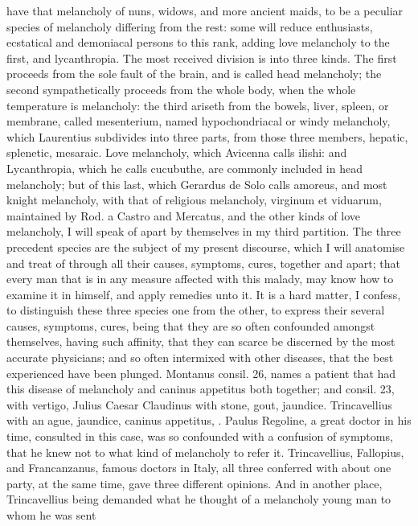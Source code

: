{{have that melancholy of nuns, widows, and more ancient maids, to be a
peculiar species of melancholy differing from the rest: some will
reduce enthusiasts, ecstatical and demoniacal persons to this rank,
adding  love melancholy to the first, and lycanthropia. The most
received division is into three kinds. The first proceeds from the sole
fault of the brain, and is called head melancholy; the second
sympathetically proceeds from the whole body, when the whole
temperature is melancholy: the third ariseth from the bowels, liver,
spleen, or membrane, called mesenterium, named hypochondriacal or windy
melancholy, which Laurentius subdivides into three parts, from
those three members, hepatic, splenetic, mesaraic. Love melancholy,
which Avicenna calls ilishi: and Lycanthropia, which he calls
cucubuthe, are commonly included in head melancholy; but of this last,
which Gerardus de Solo calls amoreus, and most knight melancholy, with
that of religious melancholy, virginum et viduarum, maintained by Rod.
a Castro and Mercatus, and the other kinds of love melancholy, I will
speak of apart by themselves in my third partition. The three precedent
species are the subject of my present discourse, which I will anatomise
and treat of through all their causes, symptoms, cures, together and
apart; that every man that is in any measure affected with this malady,
may know how to examine it in himself, and apply remedies unto it.
It is a hard matter, I confess, to distinguish these three species one
from the other, to express their several causes, symptoms, cures, being
that they are so often confounded amongst themselves, having such
affinity, that they can scarce be discerned by the most accurate
physicians; and so often intermixed with other diseases, that the best
experienced have been plunged. Montanus consil. 26, names a patient
that had this disease of melancholy and caninus appetitus both
together; and consil. 23, with vertigo, Julius Caesar Claudinus
with stone, gout, jaundice. Trincavellius with an ague, jaundice,
caninus appetitus, \etc{}. Paulus Regoline, a great doctor in his
time, consulted in this case, was so confounded with a confusion of
symptoms, that he knew not to what kind of melancholy to refer it.
Trincavellius, Fallopius, and Francanzanus, famous doctors in
Italy, all three conferred with about one party, at the same time, gave
three different opinions. And in another place, Trincavellius being
demanded what he thought of a melancholy young man to whom he was sent
}}
